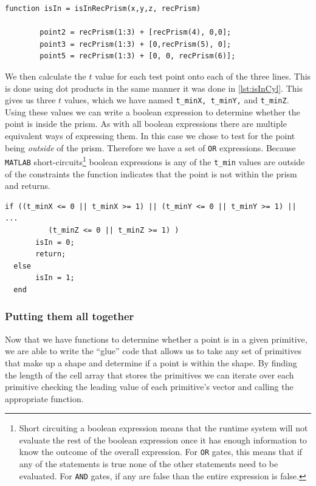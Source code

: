 \documentclass[authoryearcitations]{UoYCSproject}
\begin{document}
\begin{lstlisting}[caption={Implementation of finding points that lie within a rectangular prism}, label=lst:isInPrism]
function isIn = isInRecPrism(x,y,z, recPrism)
    
        point2 = recPrism(1:3) + [recPrism(4), 0,0];
        point3 = recPrism(1:3) + [0,recPrism(5), 0];
        point5 = recPrism(1:3) + [0, 0, recPrism(6)];
\end{lstlisting}

We then calculate the $t$ value for each test point onto each of the three lines. This is done using dot products
in the same manner it was done in \ref{lst:isInCyl}. This gives us three $t$ values, which we have named
\verb+t_minX, t_minY,+ and \verb+t_minZ+. Using these values we can write a boolean expression to determine
whether the point is inside the prism. As with all boolean expressions there are multiple equivalent ways
of expressing them. In this case we chose to test for the point being \emph{outside} of the prism. Therefore
we have a set of \verb+OR+ expressions. Because \verb+MATLAB+ short-circuits\footnote{Short circuiting a boolean 
expression means that the runtime system will not evaluate the rest of the boolean expression once it has enough
information to know the outcome of the overall expression. For \texttt{OR} gates, this means that if any of the
statements is true none of the other statements need to be evaluated. For \texttt{AND} gates, if any are false
than the entire expression is false.} boolean expressions is any of the \verb+t_min+ values are outside of the
constraints the function indicates that the point is not within the prism and returns. 

\begin{lstlisting}[caption={Boolean expression for points in a RecPrism}, label=lst:boolExpr, firstnumber=19]
  if ((t_minX <= 0 || t_minX >= 1) || (t_minY <= 0 || t_minY >= 1) || ...
          (t_minZ <= 0 || t_minZ >= 1) )
       isIn = 0;
       return;
  else
       isIn = 1;
  end
\end{lstlisting} 

\subsubsection{Putting them all together}

Now that we have functions to determine whether a point is in a given primitive, we are able to write the ``glue''
code that allows us to take any set of primitives that make up a shape and determine if a point is within
the shape. By finding the length of the cell array that stores the primitives we can iterate over each primitive
checking the leading value of each primitive's vector and calling the appropriate function. 
\end{document}
